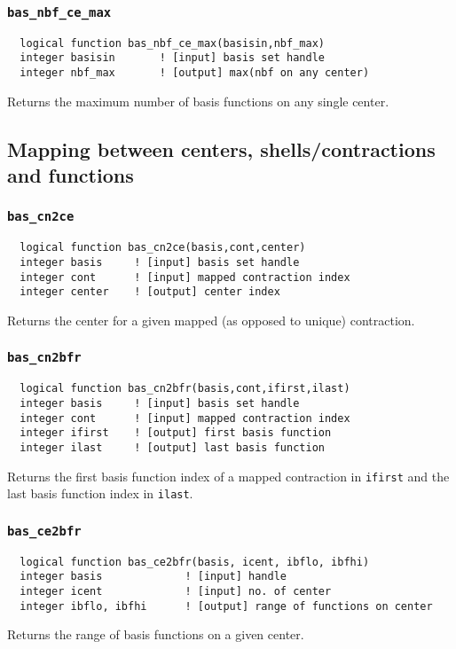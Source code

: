 \subsubsection{{\tt bas\_nbf\_ce\_max}}
\begin{verbatim}
  logical function bas_nbf_ce_max(basisin,nbf_max)
  integer basisin       ! [input] basis set handle
  integer nbf_max       ! [output] max(nbf on any center)
\end{verbatim}
Returns the maximum number of basis functions on any single center.

\subsection{Mapping between centers, shells/contractions and functions}

\subsubsection{{\tt bas\_cn2ce}}
\begin{verbatim}
  logical function bas_cn2ce(basis,cont,center)
  integer basis     ! [input] basis set handle
  integer cont      ! [input] mapped contraction index
  integer center    ! [output] center index
\end{verbatim}
Returns the center for a given mapped (as opposed to unique)
contraction.

\subsubsection{{\tt bas\_cn2bfr}}
\begin{verbatim}
  logical function bas_cn2bfr(basis,cont,ifirst,ilast)
  integer basis     ! [input] basis set handle
  integer cont      ! [input] mapped contraction index
  integer ifirst    ! [output] first basis function
  integer ilast     ! [output] last basis function     
\end{verbatim}
Returns the first basis function index of a mapped contraction in
{\tt ifirst} and the last basis function index in {\tt ilast}.

\subsubsection{{\tt bas\_ce2bfr}}
\begin{verbatim}
  logical function bas_ce2bfr(basis, icent, ibflo, ibfhi)
  integer basis             ! [input] handle
  integer icent             ! [input] no. of center
  integer ibflo, ibfhi      ! [output] range of functions on center
\end{verbatim}
Returns the range of basis functions on a given center.

